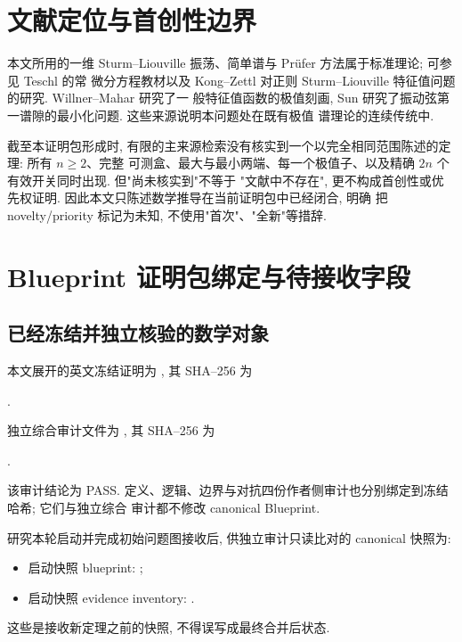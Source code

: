 \documentclass[UTF8]{ctexart}
\begin{document}
\section{文献定位与首创性边界}

本文所用的一维 Sturm--Liouville 振荡、简单谱与 Pr\"ufer 方法属于标准理论; 可参见 Teschl 的常
微分方程教材以及 Kong--Zettl 对正则 Sturm--Liouville 特征值问题的研究. Willner--Mahar 研究了一
般特征值函数的极值刻画, Sun 研究了振动弦第一谱隙的最小化问题. 这些来源说明本问题处在既有极值
谱理论的连续传统中.

截至本证明包形成时, 有限的主来源检索没有核实到一个以完全相同范围陈述的定理: 所有 $n\ge2$、完整
可测盒、最大与最小两端、每一个极值子、以及精确 $2n$ 个有效开关同时出现. 但"尚未核实到"不等于
"文献中不存在", 更不构成首创性或优先权证明. 因此本文只陈述数学推导在当前证明包中已经闭合, 明确
把 novelty/priority 标记为未知, 不使用"首次"、"全新"等措辞.

\section{Blueprint 证明包绑定与待接收字段}
\subsection{已经冻结并独立核验的数学对象}

本文展开的英文冻结证明为
\texttt{}, 其 SHA--256 为
\begin{center}
	\texttt{}.
\end{center}
独立综合审计文件为
\texttt{},
其 SHA--256 为
\begin{center}
	\texttt{}.
\end{center}
该审计结论为 PASS. 定义、逻辑、边界与对抗四份作者侧审计也分别绑定到冻结哈希; 它们与独立综合
审计都不修改 canonical Blueprint.

研究本轮启动并完成初始问题图接收后, 供独立审计只读比对的 canonical 快照为:
\begin{itemize}
	\item 启动快照 blueprint: \texttt{};
	\item 启动快照 evidence inventory: \texttt{}.
\end{itemize}
这些是接收新定理之前的快照, 不得误写成最终合并后状态.
\end{document}
